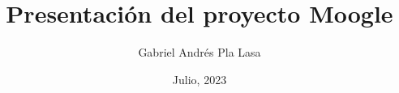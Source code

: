 \documentclass{beamer}
\title[Moogle]{Presentación del proyecto Moogle}
\author{Gabriel Andrés Pla Lasa}
\institute[MATCOM]{Facultad de Matemática y Computación \\ Universidad de La Habana}
\date{Julio, 2023}
\begin{document}
\frame{\titlepage}
\frame{\tableofcontents}




\end{document}
